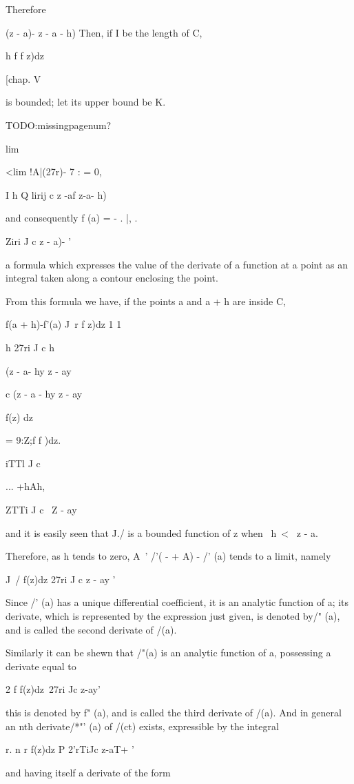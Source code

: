 {{Therefore

(z - a)- z - a - h) Then, if I be the length of C,

h f f z)dz

[chap. V

is bounded; let its upper bound be K.

TODO:missingpagenum?

lim

<lim !A|(27r)- 7 : = 0,

I h Q lirij c z -af z-a- h)

and consequently f (a) = - . |, .

   Ziri J c z - a)- '

a formula which expresses the value of the derivate of a function at a
point as an integral taken along a contour enclosing the point.

From this formula we have, if the points a and a + h are inside C,

f(a + h)-f'(a) J\ r f z)dz 1 1

h 27ri J c h

(z - a- hy z - ay

c (z - a - hy z - ay

f(z) dz

= 9:Z;f f )dz.

iTTl J c

... +hAh,

ZTTi J c \ Z - ay

and it is easily seen that J./ is a bounded function of z when \ h\ <
\ z - a.

Therefore, as h tends to zero, A~' /'( - + A) - /' (a) tends to a
limit, namely

J\ / f(z)dz 27ri J c z - ay '

Since /' (a) has a unique differential coefficient, it is an analytic
function of a; its derivate, which is represented by the expression
just given, is denoted by/" (a), and is called the second derivate of
/(a).

Similarly it can be shewn that /"(a) is an analytic function of a,
possessing a derivate equal to

2 f f(z)dz\ 27ri Jc z-ay'

this is denoted by f" (a), and is called the third derivate of /(a).
And in general an nth derivate/*"' (a) of /(ct) exists, expressible by
the integral

r. n r f(z)dz P 2'rTiJc z-aT+ '

and having itself a derivate of the form

}}

